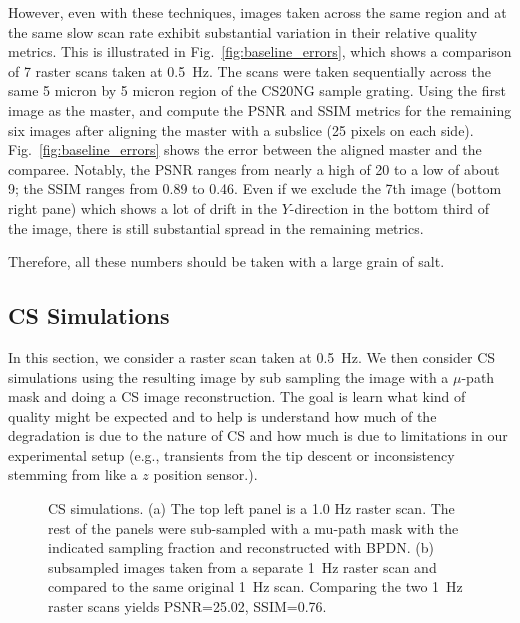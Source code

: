 \documentclass[11pt]{article}
\begin{document}
However, even with these techniques, images taken across the same region and at the same slow scan rate exhibit substantial variation in their relative quality metrics. This is illustrated in Fig.~\ref{fig:baseline_errors}, which shows a comparison of 7 raster scans taken at 0.5~Hz. The scans were taken sequentially across the same 5 micron by 5 micron region of the CS20NG sample grating. Using the first image as the master, and compute the PSNR and SSIM metrics for the remaining six images after aligning the master with a subslice (25 pixels on each side). Fig.~\ref{fig:baseline_errors} shows the error between the aligned master and the comparee. Notably, the PSNR ranges from nearly a high of 20 to a low of about 9; the SSIM ranges from 0.89 to 0.46. Even if we exclude the 7th image (bottom right pane) which shows a lot of drift in the $Y$-direction in the bottom third of the image, there is still substantial spread in the remaining metrics. 

Therefore, all these numbers should be taken with a large grain of salt.



\subsection{CS Simulations}
In this section, we consider a raster scan taken at 0.5~Hz. We then consider CS simulations using the resulting image by sub sampling the image with a $\mu$-path mask and doing a CS image reconstruction. The goal is learn what kind of quality might be expected and to help is understand how much of the degradation is due to the nature of CS and how much is due to limitations in our experimental setup (e.g., transients from the tip descent or inconsistency stemming from like a $z$ position sensor.).


\begin{figure}[h!]
  \begin{subfigure}{1\textwidth}
      
  \caption{}
  \label{fig:cs_sim_0p5}
  \end{subfigure}
  \begin{subfigure}{1\textwidth}
    
    \caption{}
    \label{fig:cs_sim_raster_0p5_1p0}
  \end{subfigure}
  \caption{CS simulations. (a) The top left panel is a 1.0 Hz raster scan. The rest of the panels were sub-sampled with a mu-path mask with the indicated sampling fraction and reconstructed with BPDN. (b) subsampled images taken from a separate 1~Hz raster scan and compared to the same original 1~Hz scan. Comparing the two 1~Hz raster scans yields PSNR=25.02, SSIM=0.76.}
  \label{fig:cs_sim_against_raster}
\end{figure}
\end{document}
